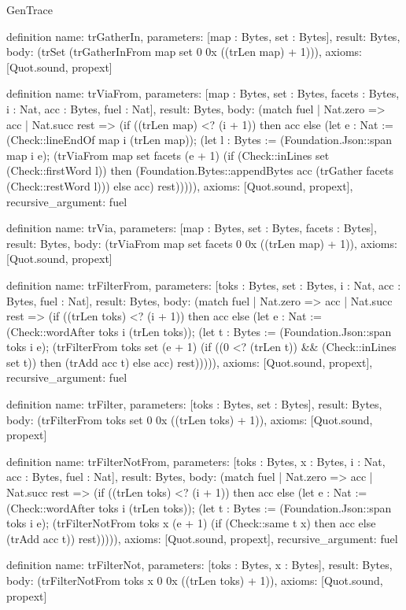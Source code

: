 \begin{lexlean}{GenTrace}
\begin{semanticmodule}
definition{
  name: trGatherIn,
  parameters: [map : Bytes, set : Bytes],
  result: Bytes,
  body: (trSet (trGatherInFrom map set 0 0x ((trLen map) + 1))),
  axioms: [Quot.sound, propext]
}

definition{
  name: trViaFrom,
  parameters: [map : Bytes, set : Bytes, facets : Bytes, i : Nat, acc : Bytes, fuel : Nat],
  result: Bytes,
  body: (match fuel
    | Nat.zero => acc
    | Nat.succ rest => (if ((trLen map) <? (i + 1)) then acc else (let e : Nat := (Check::lineEndOf map i (trLen map)); (let l : Bytes := (Foundation.Json::span map i e); (trViaFrom map set facets (e + 1) (if (Check::inLines set (Check::firstWord l)) then (Foundation.Bytes::appendBytes acc (trGather facets (Check::restWord l))) else acc) rest))))),
  axioms: [Quot.sound, propext],
  recursive_argument: fuel
}

definition{
  name: trVia,
  parameters: [map : Bytes, set : Bytes, facets : Bytes],
  result: Bytes,
  body: (trViaFrom map set facets 0 0x ((trLen map) + 1)),
  axioms: [Quot.sound, propext]
}

definition{
  name: trFilterFrom,
  parameters: [toks : Bytes, set : Bytes, i : Nat, acc : Bytes, fuel : Nat],
  result: Bytes,
  body: (match fuel
    | Nat.zero => acc
    | Nat.succ rest => (if ((trLen toks) <? (i + 1)) then acc else (let e : Nat := (Check::wordAfter toks i (trLen toks)); (let t : Bytes := (Foundation.Json::span toks i e); (trFilterFrom toks set (e + 1) (if ((0 <? (trLen t)) && (Check::inLines set t)) then (trAdd acc t) else acc) rest))))),
  axioms: [Quot.sound, propext],
  recursive_argument: fuel
}

definition{
  name: trFilter,
  parameters: [toks : Bytes, set : Bytes],
  result: Bytes,
  body: (trFilterFrom toks set 0 0x ((trLen toks) + 1)),
  axioms: [Quot.sound, propext]
}

definition{
  name: trFilterNotFrom,
  parameters: [toks : Bytes, x : Bytes, i : Nat, acc : Bytes, fuel : Nat],
  result: Bytes,
  body: (match fuel
    | Nat.zero => acc
    | Nat.succ rest => (if ((trLen toks) <? (i + 1)) then acc else (let e : Nat := (Check::wordAfter toks i (trLen toks)); (let t : Bytes := (Foundation.Json::span toks i e); (trFilterNotFrom toks x (e + 1) (if (Check::same t x) then acc else (trAdd acc t)) rest))))),
  axioms: [Quot.sound, propext],
  recursive_argument: fuel
}

definition{
  name: trFilterNot,
  parameters: [toks : Bytes, x : Bytes],
  result: Bytes,
  body: (trFilterNotFrom toks x 0 0x ((trLen toks) + 1)),
  axioms: [Quot.sound, propext]
}


\end{semanticmodule}
\end{lexlean}
